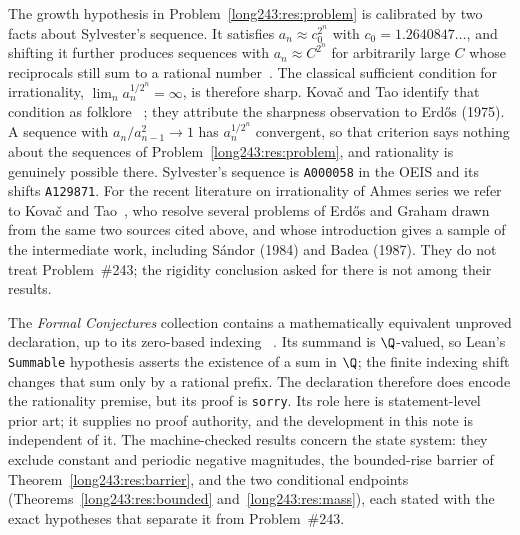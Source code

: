 The growth hypothesis in Problem~\ref{long243:res:problem} is calibrated by two facts
about Sylvester's sequence.  It satisfies $a_n\approx c_0^{2^{n}}$ with
$c_0=1.2640847\ldots$, and shifting it further produces sequences with
$a_n\approx C^{2^{n}}$ for arbitrarily large $C$ whose reciprocals still sum
to a rational number~\cite[arXiv v4, p.~2]{kovactao2024}.  The classical sufficient
condition for irrationality, $\lim_n a_n^{1/2^{n}}=\infty$, is therefore
sharp.  Kova\v{c} and Tao identify that condition as folklore
~\cite[arXiv v4, p.~2]{kovactao2024}; they attribute the sharpness observation to
Erd\H{o}s (1975).  A sequence with
$a_n/a_{n-1}^{2}\to1$ has $a_n^{1/2^{n}}$
convergent, so that criterion says nothing about the sequences of
Problem~\ref{long243:res:problem}, and rationality is genuinely possible there.
Sylvester's
sequence is \texttt{A000058} in the OEIS and its shifts \texttt{A129871}.  For
the recent literature on irrationality of Ahmes series we refer to Kova\v{c}
and Tao~\cite{kovactao2024}, who resolve several problems of Erd\H{o}s and
Graham drawn from the same two sources cited above, and whose introduction
gives a sample of the intermediate work, including S\'andor (1984) and Badea
(1987).  They do not treat Problem~\#243; the rigidity conclusion asked for
there is not among their results.

The \emph{Formal Conjectures} collection contains a mathematically equivalent
unproved declaration, up to its zero-based indexing
~\cite{formalconjectures243}.  Its summand is $\Q$-valued, so Lean's
\texttt{Summable} hypothesis asserts the existence of a sum in $\Q$; the
finite indexing shift changes that sum only by a rational prefix.  The
declaration therefore does encode the rationality premise, but its proof is
\texttt{sorry}.  Its role here is statement-level prior art; it supplies no
proof authority, and the development in this note is independent of it.
The machine-checked results concern the state system: they exclude constant and
periodic negative magnitudes, the bounded-rise barrier of
Theorem~\ref{long243:res:barrier}, and the two conditional endpoints
(Theorems~\ref{long243:res:bounded} and~\ref{long243:res:mass}), each stated with the exact
hypotheses that separate it from Problem~\#243.

\statusboundary

